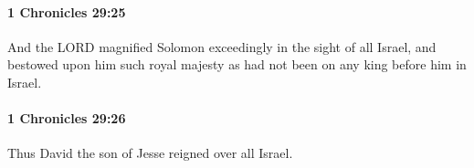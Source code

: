 		\paragraph{1 Chronicles 29:25} %
			\label{1CHRONICLES-29-25}

			And the LORD magnified Solomon exceedingly in the sight of all Israel, and bestowed upon him such royal majesty as had not been on any king before him in Israel.


		\paragraph{1 Chronicles 29:26} %
			\label{1CHRONICLES-29-26}

			Thus David the son of Jesse reigned over all Israel.


